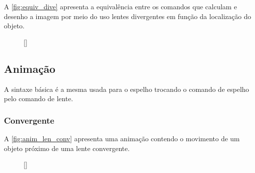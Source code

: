 \documentclass[a4paper,10pt]{article}
\begin{document}
A \autoref{fig:equiv_dive} apresenta a equivalência entre os comandos que calculam e desenho a imagem por meio do uso lentes divergentes em função da localização do objeto.

\begin{figure}[!ht]
  \centering
  \begin{minipage}[c]{0.45\linewidth}
  \end{minipage}%
  \begin{minipage}[c]{0.45\linewidth}
  \end{minipage}
  [\linewidth]{
    \hfill
  }
\end{figure}

\subsection{Animação}

A sintaxe básica é a mesma usada para o espelho trocando o comando de espelho pelo comando de lente.

\subsubsection{Convergente}

A \autoref{fig:anim_len_conv} apresenta uma animação contendo o movimento de um objeto próximo de uma lente convergente.

\begin{figure}[!ht]
  \centering
  [\linewidth]{
  }
\end{figure}
\end{document}
